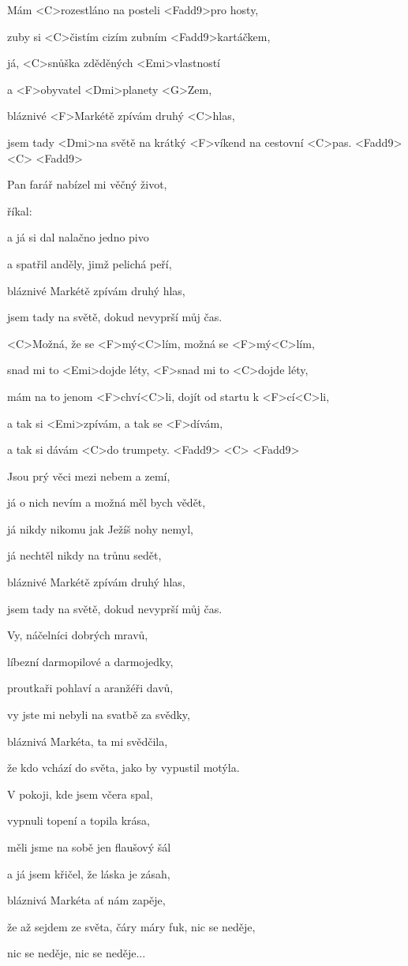 

\zs
Mám <C>rozestláno na posteli <Fadd9>pro hosty,

zuby si <C>čistím cizím zubním <Fadd9>kartáčkem,

já, <C>snůška zděděných <Emi>vlastností

a <F>obyvatel <Dmi>planety <G>Zem,

bláznivé <F>Markétě zpívám druhý <C>hlas,

jsem tady <Dmi>na světě na krátký <F>víkend na cestovní <C>pas. 
<Fadd9> <C> <Fadd9>
\ks

\zs
Pan farář nabízel mi věčný život,

říkal: 

a já si dal nalačno jedno pivo

a spatřil anděly, jimž pelichá peří,

bláznivé Markétě zpívám druhý hlas,

jsem tady na světě, dokud nevyprší můj čas.
\ks

\zr
<C>Možná, že se <F>mý<C>lím, možná se <F>mý<C>lím,

snad mi to <Emi>dojde léty, <F>snad mi to <C>dojde léty,

mám na to jenom <F>chví<C>li, dojít od startu k <F>cí<C>li,

a tak si <Emi>zpívám, a tak se <F>dívám,

a tak si dávám <C>do trumpety. <Fadd9> <C> <Fadd9>
\kr

\zs
Jsou prý věci mezi nebem a zemí,

já o nich nevím a možná měl bych vědět,

já nikdy nikomu jak Ježíš nohy nemyl,

já nechtěl nikdy na trůnu sedět,

bláznivé Markétě zpívám druhý hlas,

jsem tady na světě, dokud nevyprší můj čas.
\ks

\zs
Vy, náčelníci dobrých mravů,

líbezní darmopilové a darmojedky,

proutkaři pohlaví a aranžéři davů,

vy jste mi nebyli na svatbě za svědky,

bláznivá Markéta, ta mi svědčila,

že kdo vchází do světa, jako by vypustil motýla.
\ks

\zr \kr


\zs
V pokoji, kde jsem včera spal,

vypnuli topení a topila krása,

měli jsme na sobě jen flaušový šál

a já jsem křičel, že láska je zásah,

bláznivá Markéta ať nám zapěje,

že až sejdem ze světa, čáry máry fuk, nic se neděje,

nic se neděje, nic se neděje...
\ks

\kp






